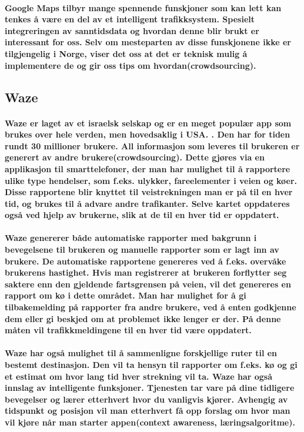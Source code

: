 \paragraph{Google Maps tilbyr mange spennende funskjoner som kan lett kan tenkes å være en del av et intelligent trafikksystem. Spesielt integreringen av sanntidsdata og hvordan denne blir brukt er interessant for oss. Selv om mesteparten av disse funskjonene ikke er tilgjengelig i Norge, viser det oss at det er teknisk mulig å implementere de og gir oss tips om hvordan(crowdsourcing).}


\subsection{Waze}
\paragraph{Waze er laget av et israelsk selskap og er en meget populær app som brukes over hele verden, men hovedsaklig i USA. . Den har for tiden rundt 30 millioner brukere. All informasjon som leveres til brukeren er generert av andre brukere(crowdsourcing). Dette gjøres via en applikasjon til smarttelefoner, der man har mulighet til å rapportere ulike type hendelser, som f.eks. ulykker, fareelementer i veien og køer. Disse rapportene blir knyttet til veistrekningen man er på til en hver tid, og brukes til å advare andre trafikanter. Selve kartet oppdateres også ved hjelp av brukerne, slik at de til en hver tid er oppdatert.}

\paragraph{Waze genererer både automatiske rapporter med bakgrunn i bevegelsene til brukeren og manuelle rapporter som er lagt inn av brukere. De automatiske rapportene genereres ved å f.eks. overvåke brukerens hastighet. Hvis man registrerer at brukeren forflytter seg saktere enn den gjeldende fartsgrensen på veien, vil det genereres en rapport om kø i dette området. Man har mulighet for å gi tilbakemelding på rapporter fra andre brukere, ved å enten godkjenne dem eller gi beskjed om at problemet ikke lenger er der. På denne måten vil trafikkmeldingene til en hver tid være oppdatert.}

\paragraph{Waze har også mulighet til å sammenligne forskjellige ruter til en bestemt destinasjon. Den vil ta hensyn til rapporter om f.eks. kø og gi et estimat om hvor lang tid hver strekning vil ta. Waze har også innslag av intelligente funksjoner. Tjenesten tar vare på dine tidligere bevegelser og lærer etterhvert hvor du vanligvis kjører. Avhengig av tidspunkt og posisjon vil man etterhvert få opp forslag om hvor man vil kjøre når man starter appen(context awareness, læringsalgoritme).}

